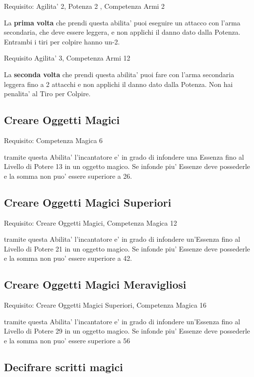 \documentclass[a4paper,11pt,twoside,openany]{book}
\begin{document}
Requisito: Agilita' 2, Potenza 2 , Competenza Armi 2

La \textbf{prima volta} che prendi questa abilita' puoi eseguire un attacco con l'arma secondaria, che deve essere leggera, e non applichi il danno dato dalla Potenza. Entrambi i tiri per colpire hanno un-2.

Requisito Agilita' 3, Competenza Armi 12

La \textbf{seconda volta} che prendi questa abilita' puoi fare con l'arma secondaria leggera fino a 2 attacchi e non applichi il danno dato dalla Potenza. Non hai penalita' al Tiro per Colpire.

\subsection{Creare Oggetti Magici}

Requisito: Competenza Magica 6

tramite questa Abilita' l'incantatore e' in grado di infondere una Essenza fino al Livello di Potere 13 in un oggetto magico. Se infonde piu' Essenze deve possederle e la somma non puo' essere superiore a 26.

\subsection{Creare Oggetti Magici Superiori}

Requisito: Creare Oggetti Magici, Competenza Magica 12

tramite questa Abilita' l'incantatore e' in grado di infondere un'Essenza fino al Livello di Potere 21 in un oggetto magico. Se infonde piu' Essenze deve possederle e la somma non puo' essere superiore a 42.

\subsection{Creare Oggetti Magici Meravigliosi}

Requisito: Creare Oggetti Magici Superiori, Competenza Magica 16

tramite questa Abilita' l'incantatore e' in grado di infondere un'Essenza fino al Livello di Potere 29 in un oggetto magico. Se infonde piu' Essenze deve possederle e la somma non puo' essere superiore a 56

\subsection{Decifrare scritti magici}
\end{document}

